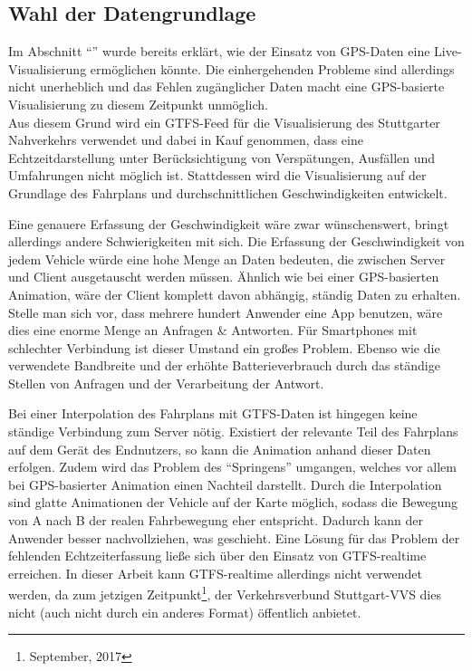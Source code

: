 \subsection{Wahl der Datengrundlage}
\label{ssub:wahl_der_datengrundlage}
  Im Abschnitt "`"' wurde bereits erklärt, wie der Einsatz von GPS-Daten eine Live-Visualisierung ermöglichen könnte. Die einhergehenden Probleme sind allerdings nicht unerheblich und das Fehlen zugänglicher Daten macht eine GPS-basierte Visualisierung zu diesem Zeitpunkt unmöglich.\\

  Aus diesem Grund wird ein GTFS-Feed für die Visualisierung des Stuttgarter Nahverkehrs verwendet und dabei in Kauf genommen, dass eine Echtzeitdarstellung unter Berücksichtigung von Verspätungen, Ausfällen und Umfahrungen nicht möglich ist. Stattdessen wird die Visualisierung auf der Grundlage des Fahrplans und durchschnittlichen Geschwindigkeiten entwickelt.

  Eine genauere Erfassung der Geschwindigkeit wäre zwar wünschenswert, bringt allerdings andere Schwierigkeiten mit sich. Die Erfassung der Geschwindigkeit von jedem Vehicle würde eine hohe Menge an Daten bedeuten, die zwischen Server und Client ausgetauscht werden müssen. Ähnlich wie bei einer GPS-basierten Animation, wäre der Client komplett davon abhängig, ständig Daten zu erhalten. Stelle man sich vor, dass mehrere hundert Anwender eine App benutzen, wäre dies eine enorme Menge an Anfragen \& Antworten. Für Smartphones mit schlechter Verbindung ist dieser Umstand ein großes Problem. Ebenso wie die verwendete Bandbreite und der erhöhte Batterieverbrauch durch das ständige Stellen von Anfragen und der Verarbeitung der Antwort.

  Bei einer Interpolation des Fahrplans mit GTFS-Daten ist hingegen keine ständige Verbindung zum Server nötig. Existiert der relevante Teil des Fahrplans auf dem Gerät des Endnutzers, so kann die Animation anhand dieser Daten erfolgen. Zudem wird das Problem des "`Springens"' umgangen, welches vor allem bei GPS-basierter Animation einen Nachteil darstellt. Durch die Interpolation sind glatte Animationen der Vehicle auf der Karte möglich, sodass die Bewegung von A nach B der realen Fahrbewegung eher entspricht. Dadurch kann der Anwender besser nachvollziehen, was geschieht.
  Eine Lösung für das Problem der fehlenden Echtzeiterfassung ließe sich über den Einsatz von GTFS-realtime erreichen. In dieser Arbeit kann GTFS-realtime allerdings nicht verwendet werden, da zum jetzigen Zeitpunkt\footnote{September, 2017}, der Verkehrsverbund Stuttgart-VVS dies nicht (auch nicht durch ein anderes Format) öffentlich anbietet.
  
